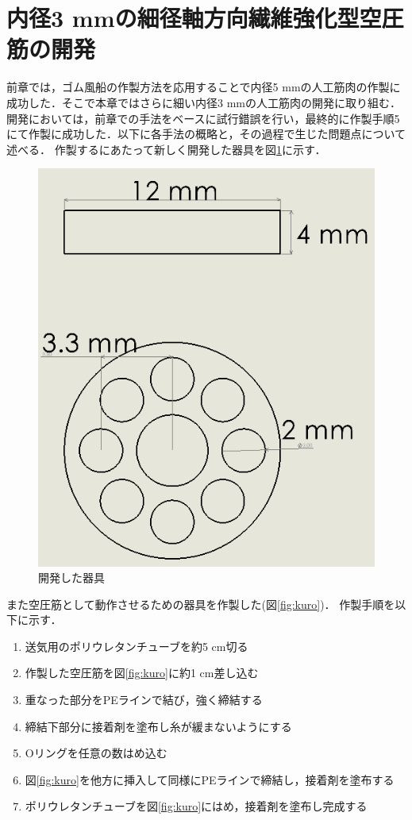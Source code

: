 \section{内径3 mmの細径軸方向繊維強化型空圧筋の開発}
前章では，ゴム風船の作製方法を応用することで内径5 mmの人工筋肉の作製に成功した．そこで本章ではさらに細い内径3 mmの人工筋肉の開発に取り組む．
開発においては，前章での手法をベースに試行錯誤を行い，最終的に作製手順5にて作製に成功した．以下に各手法の概略と，その過程で生じた問題点について述べる．
作製するにあたって新しく開発した器具を図\ref{fig:setu}に示す．
\begin{figure}[h]
  \centering  %
  \includegraphics[scale=0.3]{pic/setu.PNG}
  \caption{開発した器具}
  \label{fig:setu}
\end{figure}
また空圧筋として動作させるための器具を作製した(図\ref{fig:kuro})．
作製手順を以下に示す．
\begin{enumerate}
  \item 送気用のポリウレタンチューブを約5 cm切る
  \item 作製した空圧筋を図\ref{fig:kuro}に約1 cm差し込む
  \item 重なった部分をPEラインで結び，強く締結する
  \item 締結下部分に接着剤を塗布し糸が緩まないようにする
  \item Oリングを任意の数はめ込む
  \item 図\ref{fig:kuro}を他方に挿入して同様にPEラインで締結し，接着剤を塗布する
  \item ポリウレタンチューブを図\ref{fig:kuro}にはめ，接着剤を塗布し完成する
\end{enumerate}
